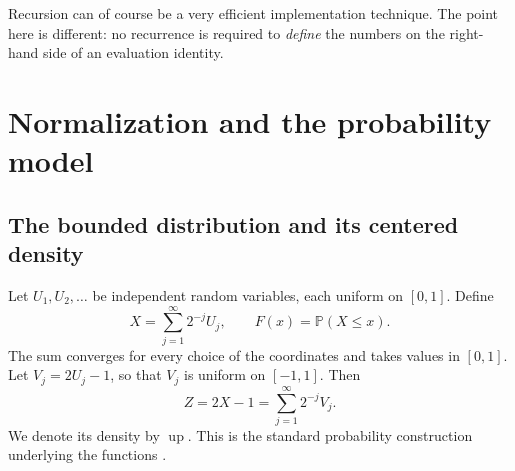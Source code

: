 \documentclass[11pt,a4paper]{article}
\numberwithin{equation}{section}
\theoremstyle{definition}
\theoremstyle{remark}
\newcommand{\up}{\operatorname{up}}
\newcommand{\Pp}{\mathbb P}
\begin{document}
Recursion can of course be a very efficient implementation technique. The point here is different: no recurrence is required to \emph{define} the numbers on the right-hand side of an evaluation identity.

\section{Normalization and the probability model}
\label{sec:setup}

\subsection{The bounded distribution and its centered density}
Let $U_1,U_2,\ldots$ be independent random variables, each uniform on $[0,1]$. Define
\begin{equation}
 X=\sum_{j=1}^{\infty}2^{-j}U_j,
 \qquad F(x)=\Pp(X\le x).
 \label{eq:random-X}
\end{equation}
The sum converges for every choice of the coordinates and takes values in $[0,1]$. Let $V_j=2U_j-1$, so that $V_j$ is uniform on $[-1,1]$. Then
\begin{equation}
 Z=2X-1=\sum_{j=1}^{\infty}2^{-j}V_j.
 \label{eq:random-Z}
\end{equation}
We denote its density by $\up$. This is the standard probability construction underlying the functions \cite{arias1982,arias2018}.
\end{document}
